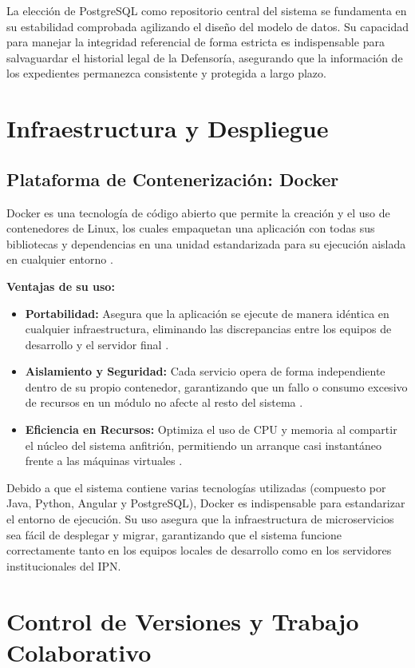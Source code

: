 La elección de PostgreSQL como repositorio central del sistema se fundamenta en su estabilidad comprobada agilizando el diseño del modelo de datos. Su capacidad para manejar la integridad referencial de forma estricta es indispensable para salvaguardar el historial legal de la Defensoría, asegurando que la información de los expedientes permanezca consistente y protegida a largo plazo.

\section{Infraestructura y Despliegue}
\subsection{Plataforma de Contenerización: Docker}
Docker es una tecnología de código abierto que permite la creación y el uso de contenedores de Linux, los cuales empaquetan una aplicación con todas sus bibliotecas y dependencias en una unidad estandarizada para su ejecución aislada en cualquier entorno \cite{43} .

\textbf{Ventajas de su uso:}
\begin{itemize}
\item \textbf{Portabilidad:} Asegura que la aplicación se ejecute de manera idéntica en cualquier infraestructura, eliminando las discrepancias entre los equipos de desarrollo y el servidor final \cite{43} .
\item \textbf{Aislamiento y Seguridad:} Cada servicio opera de forma independiente dentro de su propio contenedor, garantizando que un fallo o consumo excesivo de recursos en un módulo no afecte al resto del sistema \cite{43} .
\item \textbf{Eficiencia en Recursos:} Optimiza el uso de CPU y memoria al compartir el núcleo del sistema anfitrión, permitiendo un arranque casi instantáneo frente a las máquinas virtuales \cite{43} .
\end{itemize}

Debido a que el sistema contiene varias tecnologías utilizadas (compuesto por Java, Python, Angular y PostgreSQL), Docker es indispensable para estandarizar el entorno de ejecución. Su uso asegura que la infraestructura de microservicios sea fácil de desplegar y migrar, garantizando que el sistema funcione correctamente tanto en los equipos locales de desarrollo como en los servidores institucionales del IPN.

\section{Control de Versiones y Trabajo Colaborativo}
